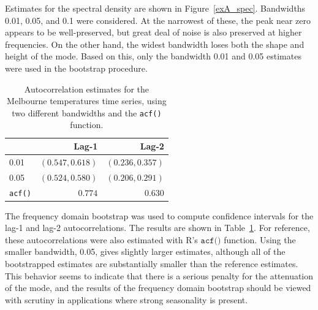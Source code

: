 Estimates for the spectral density are shown in Figure~\ref{exA_spec}.
Bandwidths 0.01, 0.05, and 0.1 were considered.
At the narrowest of these, the peak near zero appears to be well-preserved,
but great deal of noise is also preserved at higher frequencies.
On the other hand, the widest bandwidth loses both the shape and height of the
mode. Based on this, only the bandwidth 0.01 and 0.05 estimates were used in
the bootstrap procedure.

    \begin{table}[h]
    \centering
    \begin{tabular}{lrr}
    \toprule
    & Lag-1 & Lag-2 \\
    \midrule
    0.01 & $(0.547, 0.618)$ & $(0.236, 0.357)$ \\
    0.05 & $(0.524, 0.580)$ & $(0.206, 0.291)$ \\
    \texttt{acf()} & $0.774$ & $0.630$ \\
    \bottomrule
    \end{tabular}
    \caption{
        Autocorrelation estimates for the Melbourne temperatures time series,
        using two different bandwidths and the \texttt{acf()} function.}
    \label{exA_est}
    \end{table}

The frequency domain bootstrap was used to compute confidence intervals for the
lag-1 and lag-2 autocorrelations.
The results are shown in Table~\ref{exA_est}.
For reference, these autocorrelations were also estimated with R's
$\texttt{acf()}$ function.
Using the smaller bandwidth, 0.05, gives slightly larger estimates,
although all of the bootstrapped estimates are substantially smaller than the
reference estimates.
This behavior seems to indicate that there is a serious penalty for the
attenuation of the mode,
and the results of the frequency domain bootstrap should be viewed with
scrutiny in applications where strong seasonality is present.

